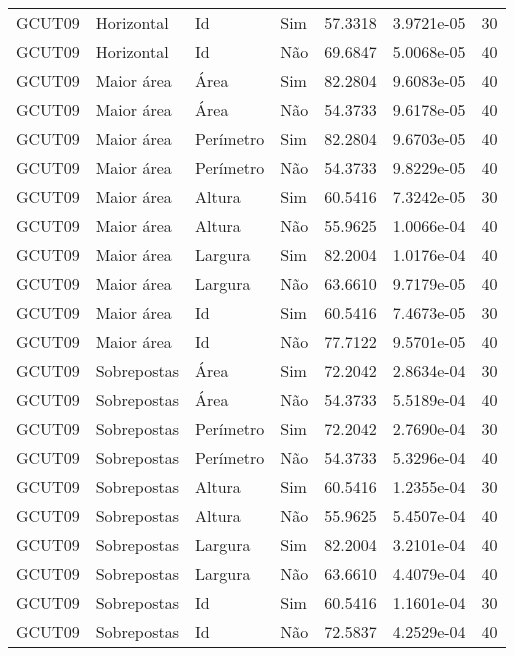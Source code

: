 \begin{tabular}{llllrrr}
    GCUT09    & Horizontal  & Id        & Sim         & 57.3318      & 3.9721e-05 & 30       \\
    GCUT09    & Horizontal  & Id        & Não         & 69.6847      & 5.0068e-05 & 40       \\
    GCUT09    & Maior área  & Área      & Sim         & 82.2804      & 9.6083e-05 & 40       \\
    GCUT09    & Maior área  & Área      & Não         & 54.3733      & 9.6178e-05 & 40       \\
    GCUT09    & Maior área  & Perímetro & Sim         & 82.2804      & 9.6703e-05 & 40       \\
    GCUT09    & Maior área  & Perímetro & Não         & 54.3733      & 9.8229e-05 & 40       \\
    GCUT09    & Maior área  & Altura    & Sim         & 60.5416      & 7.3242e-05 & 30       \\
    GCUT09    & Maior área  & Altura    & Não         & 55.9625      & 1.0066e-04 & 40       \\
    GCUT09    & Maior área  & Largura   & Sim         & 82.2004      & 1.0176e-04 & 40       \\
    GCUT09    & Maior área  & Largura   & Não         & 63.6610      & 9.7179e-05 & 40       \\
    GCUT09    & Maior área  & Id        & Sim         & 60.5416      & 7.4673e-05 & 30       \\
    GCUT09    & Maior área  & Id        & Não         & 77.7122      & 9.5701e-05 & 40       \\
    GCUT09    & Sobrepostas & Área      & Sim         & 72.2042      & 2.8634e-04 & 30       \\
    GCUT09    & Sobrepostas & Área      & Não         & 54.3733      & 5.5189e-04 & 40       \\
    GCUT09    & Sobrepostas & Perímetro & Sim         & 72.2042      & 2.7690e-04 & 30       \\
    GCUT09    & Sobrepostas & Perímetro & Não         & 54.3733      & 5.3296e-04 & 40       \\
    GCUT09    & Sobrepostas & Altura    & Sim         & 60.5416      & 1.2355e-04 & 30       \\
    GCUT09    & Sobrepostas & Altura    & Não         & 55.9625      & 5.4507e-04 & 40       \\
    GCUT09    & Sobrepostas & Largura   & Sim         & 82.2004      & 3.2101e-04 & 40       \\
    GCUT09    & Sobrepostas & Largura   & Não         & 63.6610      & 4.4079e-04 & 40       \\
    GCUT09    & Sobrepostas & Id        & Sim         & 60.5416      & 1.1601e-04 & 30       \\
    GCUT09    & Sobrepostas & Id        & Não         & 72.5837      & 4.2529e-04 & 40       \\
    \hline
\end{tabular}